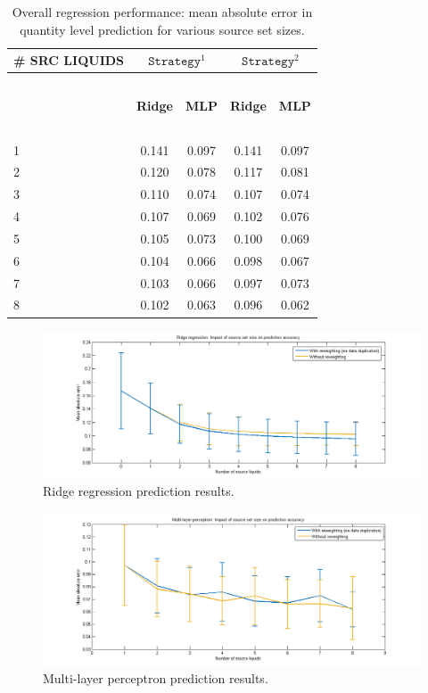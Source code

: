 \documentclass{article} %
\begin{document}
\begin{table}[t]
\caption{Overall regression performance: mean absolute error in quantity level prediction for various source set sizes.}
\label{table:result}
\begin{center}
\begin{tabular}{ l | c | c | c | c}
\textbf{\# SRC LIQUIDS} & \multicolumn{2}{c|}{$\mathtt{Strategy}^1$} & \multicolumn{2}{c}{$\mathtt{Strategy}^2$} \\ \hline
~ & ~ & ~ & ~ & ~\\
~ & \textbf{Ridge} & \textbf{MLP} & \textbf{Ridge} & \textbf{MLP}\\ \hline
~ & ~ & ~ & ~ & ~\\
1 & 0.141 & 0.097 & 0.141 & 0.097\\
2 & 0.120 & 0.078 & 0.117 & 0.081\\
3 & 0.110 & 0.074 & 0.107 & 0.074\\
4 & 0.107 & 0.069 & 0.102 & 0.076\\
5 & 0.105 & 0.073 & 0.100 & 0.069\\
6 & 0.104 & 0.066 & 0.098 & 0.067\\
7 & 0.103 & 0.066 & 0.097 & 0.073\\
8 & 0.102 & 0.063 & 0.096 & 0.062\\
\end{tabular}
\end{center}
\end{table}

\begin{figure}[htb]
\centering
\includegraphics[width=\linewidth]{source_set_size_ridge.png}
\caption{Ridge regression prediction results.}
\label{fig:ridge}
\end{figure}

\begin{figure}[htb]
\centering
\includegraphics[width=\linewidth]{source_set_size_nn.png}
\caption{Multi-layer perceptron prediction results.}
\label{fig:nn}
\end{figure}
\end{document}
